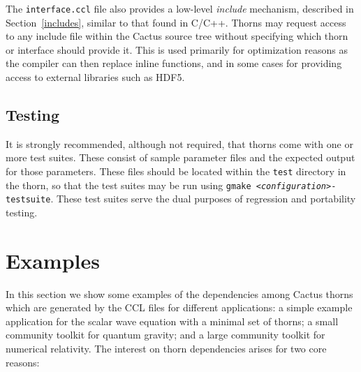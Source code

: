 \documentclass[conference]{IEEEtran}
\begin{document}
The \texttt{interface.ccl} file also provides a low-level \emph{include} mechanism, described in 
Section~\ref{includes}, similar to that
found in C/C++. Thorns may request access to any include file within the Cactus source tree
without specifying which thorn or interface should provide it. This is used primarily for optimization
reasons as the compiler can then replace inline functions, and in some cases for providing access
to external libraries such as HDF5.

\subsection{Testing}
It is strongly recommended, although not required, that thorns come with one or more test suites.
These consist of sample parameter files and the expected output for those parameters. These files
should be located within the \texttt{test} directory in the thorn, so that the test suites may be run
using \texttt{gmake \emph{<configuration>}-testsuite}. These test suites serve the dual purposes
of regression and portability testing.
















\section{Examples}
\label{examples}

In this section we show some examples of the dependencies among Cactus thorns which are generated by the CCL files 
for different applications: a simple example application for the scalar wave equation 
with a minimal set of thorns; a small community toolkit for quantum gravity; and a large community toolkit for numerical relativity. The interest on thorn dependencies arises for two core reasons:
\end{document}
